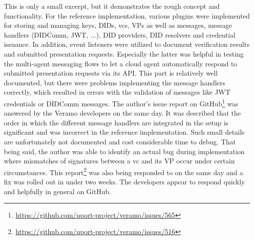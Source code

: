    This is only a small excerpt, but it demonstrates the rough concept and functionality. For the reference implementation, various plugins were implemented for storing and managing keys, \acp{DID}, \acp{vc}, \acp{VP} as well as messages, message handlers (DIDComm, JWT, ...), \ac{DID} providers, \ac{DID} resolvers and credential issuance. In addition, event listeners were utilized to document verification results and submitted presentation requests. Especially the latter was helpful in testing the multi-agent messaging flows to let a cloud agent automatically respond to submitted presentation requests via its API. This part is relatively well documented, but there were problems implementing the message handlers correctly, which resulted in errors with the validation of messages like JWT credentials or DIDComm messages. The author's issue report on GitHub\footnote{\href{https://github.com/uport-project/veramo/issues/565}{https://github.com/uport-project/veramo/issues/565}} was answered by the Veramo developers on the same day. It was described that the order in which the different message handlers are integrated in the setup is significant and was incorrect in the reference implementation. Such small details are unfortunately not documented and cost considerable time to debug. That being said, the author was able to identify an actual bug during implementation where mismatches of signatures between a \ac{vc} and its \ac{VP} occur under certain circumstances. This report\footnote{\href{https://github.com/uport-project/veramo/issues/516}{https://github.com/uport-project/veramo/issues/516}} was also being responded to on the same day and a fix was rolled out in under two weeks. The developers appear to respond quickly and helpfully in general on GitHub.
    
